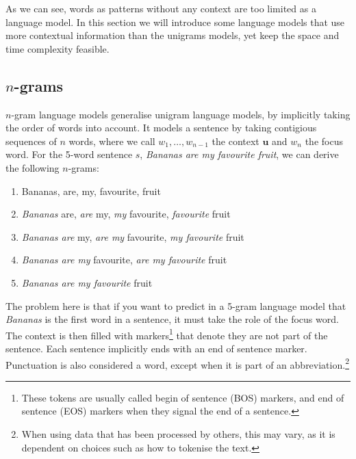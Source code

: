 
As we can see, words as patterns without any context are too limited as a language model.
In this section we will introduce some language models that use more contextual information than the unigrams models, yet keep the space and time complexity feasible.

\subsection{$n$-grams}
$n$-gram language models generalise unigram language models, by implicitly taking the order of words into account. It models a sentence by taking contigious sequences of $n$ words, where we call $w_1,\ldots,w_{n-1}$ the context $\mathbf{u}$ and $w_n$ the focus word. For the 5-word sentence $s$, \emph{Bananas are my favourite fruit}, we can derive the following $n$-grams:

\begin{enumerate}
	\item Bananas, are, my, favourite, fruit
	\item \emph{Bananas} are, \emph{are} my, \emph{my} favourite, \emph{favourite} fruit
	\item \emph{Bananas are} my, \emph{are my} favourite, \emph{my favourite} fruit
	\item \emph{Bananas are my} favourite, \emph{are my favourite} fruit
	\item \emph{Bananas are my favourite} fruit
\end{enumerate}



The problem here is that if you want to predict in a 5-gram language model that \emph{Bananas} is the first word in a sentence, it must take the role of the focus word. The context is then filled with markers\footnote{These tokens are usually called begin of sentence (BOS) markers, and end of sentence (EOS) markers when they signal the end of a sentence.} that denote they are not part of the sentence. Each sentence implicitly ends with an end of sentence marker. %
Punctuation is also considered a word, except when it is part of an abbreviation.\footnote{When using data that has been processed by others, this may vary, as it is dependent on choices such as how to tokenise the text.}

